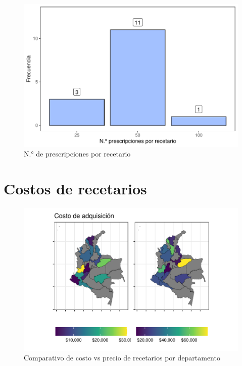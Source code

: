 \documentclass[
]{book}
\begin{document}
\begin{figure}
\includegraphics[width=0.85\linewidth]{InformeFinal_files/figure-latex/existenciaRecetarios4-1} \caption{N.° de prescripciones por recetario}\label{fig:existenciaRecetarios4}
\end{figure}

\hypertarget{costos-de-recetarios}{%
\section{Costos de recetarios}\label{costos-de-recetarios}}

\begin{figure}
\includegraphics[width=0.9\linewidth]{InformeFinal_files/figure-latex/costoRecetario-1} \caption{Comparativo de costo vs precio de recetarios por departamento}\label{fig:costoRecetario}
\end{figure}
\end{document}
